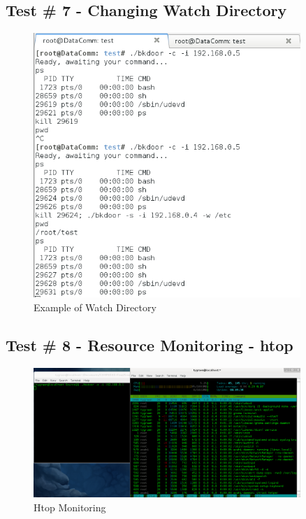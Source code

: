\documentclass[titlepage]{article}
\begin{document}
\subsection{Test \# 7 - Changing Watch Directory}

\begin{figure}[htb]                                                                       
  \begin{center}
    \includegraphics[width=0.9\textwidth]{Pictures/Watch.png}
  \end{center}
  \caption{Example of Watch Directory}
  \label{fig:watch}
\end{figure}

\clearpage

\subsection{Test \# 8 - Resource Monitoring - htop}

\begin{figure}[htb]                                                                       
  \begin{center}
    \includegraphics[width=0.9\textwidth]{Pictures/htop.png}
  \end{center}
  \caption{Htop Monitoring}
  \label{fig:htop}
\end{figure}
\end{document}
